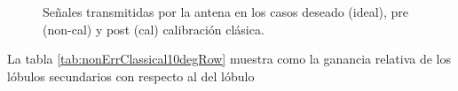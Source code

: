 \begin{figure}[H]
	\centering

	\caption{Señales transmitidas por la antena en los casos deseado (ideal), pre (non-cal) y post (cal) calibración clásica.}
	\label{fig:nonErrClassical10degRow}
\end{figure}
La tabla \ref{tab:nonErrClassical10degRow} muestra como la ganancia relativa de los lóbulos secundarios con respecto al del lóbulo
